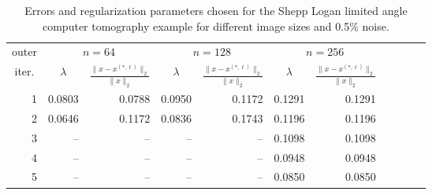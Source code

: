\begin{table}[htp]
\caption{Errors and regularization parameters chosen for the Shepp Logan limited angle computer tomography example for different image sizes and 0.5\% noise.}
\begin{center}
\begin{tabular}{|r|r|r|r|r|r|r|r|r|r|r|}
\hline
\multicolumn{1}{|c|}{outer} & \multicolumn{2}{c|}{$n = 64$} & \multicolumn{2}{c|}{$n = 128$} & \multicolumn{2}{c|}{$n = 256$} \\\cline{2-7}
\multicolumn{1}{|c|}{iter.} & \multicolumn{1}{c|}{$\lambda$} & \multicolumn{1}{c|}{$\frac{\|x - x^{(*,\ell)}\|_2}{\|x\|_2}$} & \multicolumn{1}{c|}{$\lambda$} & \multicolumn{1}{c|}{$\frac{\|x - x^{(*,\ell)}\|_2}{\|x\|_2}$}  & \multicolumn{1}{c|}{$\lambda$} & \multicolumn{1}{c|}{$\frac{\|x - x^{(*,\ell)}\|_2}{\|x\|_2}$} \\
\hline
1 & 0.0803 & 0.0788 & 0.0950 & 0.1172 & 0.1291 & 0.1291 \\
2 & 0.0646 & 0.1172 & 0.0836 & 0.1743 & 0.1196 & 0.1196 \\
3 & -- & -- & -- & -- & 0.1098 & 0.1098 \\
4 & -- & -- & -- & -- & 0.0948 & 0.0948 \\
5 & -- & -- & -- & -- & 0.0850 & 0.0850 \\
\hline
\end{tabular}
\end{center}
\label{tab:limited_angle_errs_and_reg_params}
\end{table}%
